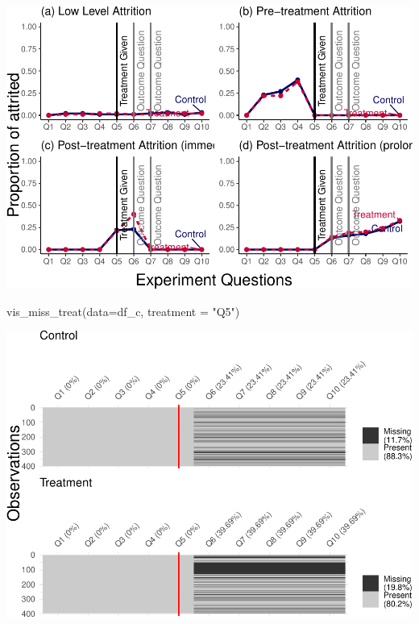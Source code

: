 \documentclass[
]{article}
\newenvironment{Shaded}{\begin{snugshade}}{\end{snugshade}}
\newcommand{\AttributeTok}[1]{\textcolor[rgb]{0.77,0.63,0.00}{#1}}
\newcommand{\FunctionTok}[1]{\textcolor[rgb]{0.00,0.00,0.00}{#1}}
\newcommand{\NormalTok}[1]{#1}
\newcommand{\StringTok}[1]{\textcolor[rgb]{0.31,0.60,0.02}{#1}}
\begin{document}
\includegraphics{paper_replication_files/figure-latex/timeline-5.pdf}

\begin{Shaded}
\begin{Highlighting}[]
\FunctionTok{vis\_miss\_treat}\NormalTok{(}\AttributeTok{data=}\NormalTok{df\_c,}
               \AttributeTok{treatment =} \StringTok{"Q5"}\NormalTok{)}
\end{Highlighting}
\end{Shaded}

\includegraphics{paper_replication_files/figure-latex/timeline-6.pdf}
\end{document}

